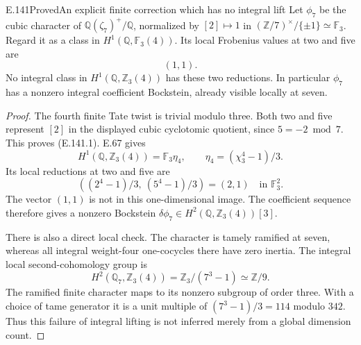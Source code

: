 \begin{result}{E.141}{Proved}{An explicit finite correction which has no integral lift}
Let \(\phi_7\) be the cubic character of
\(\mathbb Q(\zeta_7)^+/\mathbb Q\), normalized by
\([2]\mapsto1\) in
\((\mathbb Z/7)^\times/\{\pm1\}\simeq\mathbb F_3\).
Regard it as a class in
\(H^1(\mathbb Q,\mathbb F_3(4))\).
Its local Frobenius values at two and five are
\[
                              (1,1).
 \tag{E.141.1}
\]
No integral class in \(H^1(\mathbb Q,\mathbb Z_3(4))\)
has these two reductions. In particular \(\phi_7\)
has a nonzero integral coefficient Bockstein,
already visible locally at seven.
\end{result}
\begin{proof}
The fourth finite Tate twist is trivial modulo three.
Both two and five represent \([2]\) in the displayed
cubic cyclotomic quotient, since \(5=-2\bmod7\).
This proves (E.141.1).
E.67 gives
\[
 H^1(\mathbb Q,\mathbb Z_3(4))=\mathbb F_3\eta_4,
                  \qquad \eta_4=(\chi_3^4-1)/3.
 \]
Its local reductions at two and five are
\[
 \left((2^4-1)/3,\ (5^4-1)/3\right)
                         =(2,1)\quad\text{in }\mathbb F_3^2.
 \tag{E.141.2}
\]
The vector \((1,1)\) is not in this one-dimensional
image. The coefficient sequence therefore gives
a nonzero Bockstein
\(\delta\phi_7\in H^2(\mathbb Q,\mathbb Z_3(4))[3]\).

There is also a direct local check. The character is
tamely ramified at seven, whereas all integral
weight-four one-cocycles there have zero inertia.
The integral local second-cohomology group is
\[
 H^2(\mathbb Q_7,\mathbb Z_3(4))
                  =\mathbb Z_3/(7^3-1)
                  \simeq\mathbb Z/9.
 \]
The ramified finite character maps to its nonzero
subgroup of order three. With a choice of tame
generator it is a unit multiple of
\((7^3-1)/3=114\) modulo \(342\).
Thus this failure of integral lifting is not
inferred merely from a global dimension count.
\end{proof}

